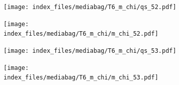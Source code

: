 \documentclass[
  11pt,
  letterpaper,
]{scrreprt}
\begin{document}
\begin{figure}

\begin{minipage}{0.50\linewidth}

\begin{figure}[H]

{\centering \texttt{[image: index\_files/mediabag/T6\_m\_chi/qs\_52.pdf]}

}


\end{figure}%

\end{minipage}%
%
\begin{minipage}{0.50\linewidth}

\begin{figure}[H]

{\centering \texttt{[image: index\_files/mediabag/T6\_m\_chi/m\_chi\_52.pdf]}

}


\end{figure}%

\end{minipage}%

\end{figure}%

\begin{figure}

\begin{minipage}{0.50\linewidth}

\begin{figure}[H]

{\centering \texttt{[image: index\_files/mediabag/T6\_m\_chi/qs\_53.pdf]}

}


\end{figure}%

\end{minipage}%
%
\begin{minipage}{0.50\linewidth}

\begin{figure}[H]

{\centering \texttt{[image: index\_files/mediabag/T6\_m\_chi/m\_chi\_53.pdf]}

}


\end{figure}%

\end{minipage}%

\end{figure}%
\end{document}
